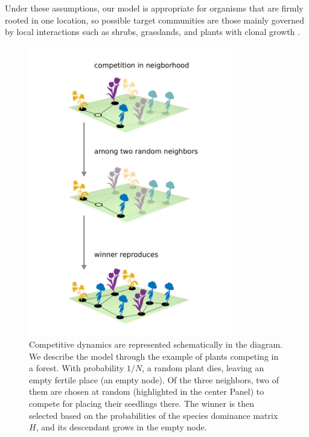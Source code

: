   Under these assumptions, our model is appropriate for organisms that are firmly rooted in one location, so possible target
communities are those mainly governed by local interactions such as shrubs, grasslands, and plants with clonal growth \cite{Dieckmann2000}.
  
\begin{figure}[htbp]
 \centering
 \includegraphics[width =0.8\textwidth]{figures/chp1/fig1.pdf}
 \caption[Competitive dynamics model]{Competitive dynamics are represented schematically in the diagram. We describe the model through the example of plants competing in a forest. With probability $1/N$, a random plant dies, leaving an empty fertile place (an empty node). Of the three neighbors, two of them are chosen at random (highlighted in the center Panel) to compete for placing their seedlings there. The winner is then selected based on the probabilities of the species dominance matrix $H$, and its descendant grows in the empty node. }
 \label{chp1:fig:1}
\end{figure}


